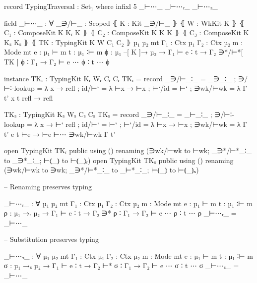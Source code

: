 \begin{code}
          record TypingTraversal : Set₁ where
            infixl  5  _⊢⋯_  _⊢⋯ᵣ_  _⊢⋯ₛ_

            field
              _⊢⋯_ :
                ∀ {_∋/⊢_ : Scoped} ⦃ K : Kit _∋/⊢_ ⦄ ⦃ W : WkKit K ⦄
                  ⦃ C₁ : ComposeKit K Kᵣ K ⦄ ⦃ C₂ : ComposeKit K K K ⦄
                  ⦃ C₃ : ComposeKit K Kₛ Kₛ ⦄
                  ⦃ TK : TypingKit K W C₁ C₂ ⦄
                  {µ₁ µ₂ mt} {Γ₁ : Ctx µ₁} {Γ₂ : Ctx µ₂} {m : Mode mt}
                  {e : µ₁ ⊢ m} {t : µ₁ ∶⊢ m} {ϕ : µ₁ –[ K ]→ µ₂} →
                Γ₁ ⊢ e ∶ t →
                Γ₂ ∋*/⊢*[ TK ] ϕ ∶ Γ₁ →
                Γ₂ ⊢ e ⋯ ϕ ∶ t ⋯ ϕ

            instance
              TKᵣ : TypingKit Kᵣ Wᵣ Cᵣ Cᵣ
              TKᵣ = record
                { _∋/⊢_∶_     = _∋_∶_
                ; ∋/⊢∶-lookup = λ x → refl
                ; id/⊢`       = λ ⊢x → ⊢x
                ; ⊢`/id       = ⊢`
                ; ∋wk/⊢wk     = λ { Γ t' x t refl → refl }
                }

              TKₛ : TypingKit Kₛ Wₛ Cₛ Cₛ
              TKₛ = record
                { _∋/⊢_∶_     = _⊢_∶_
                ; ∋/⊢∶-lookup = λ x → ⊢` refl
                ; id/⊢`       = ⊢`
                ; ⊢`/id       = λ ⊢x → ⊢x
                ; ∋wk/⊢wk     = λ Γ t' e t ⊢e → ⊢e ⊢⋯ ∋wk/⊢wk Γ t'
                }

            open TypingKit TKᵣ public using () renaming (∋wk/⊢wk to ⊢wk; _∋*/⊢*_∶_ to _∋*_∶_; ⊢⦅_⦆ to ⊢⦅_⦆ᵣ)
            open TypingKit TKₛ public using () renaming (∋wk/⊢wk to ∋wk; _∋*/⊢*_∶_ to _⊢*_∶_; ⊢⦅_⦆ to ⊢⦅_⦆ₛ)

            -- Renaming preserves typing

            _⊢⋯ᵣ_ : ∀ {µ₁ µ₂ mt} {Γ₁ : Ctx µ₁} {Γ₂ : Ctx µ₂} {m : Mode mt}
                      {e : µ₁ ⊢ m} {t : µ₁ ∶⊢ m} {ρ : µ₁ →ᵣ µ₂} →
                    Γ₁ ⊢ e ∶ t →
                    Γ₂ ∋* ρ ∶ Γ₁ →
                    Γ₂ ⊢ e ⋯ ρ ∶ t ⋯ ρ
            _⊢⋯ᵣ_ = _⊢⋯_

            -- Substitution preserves typing

            _⊢⋯ₛ_ : ∀ {µ₁ µ₂ mt} {Γ₁ : Ctx µ₁} {Γ₂ : Ctx µ₂} {m : Mode mt}
                      {e : µ₁ ⊢ m} {t : µ₁ ∶⊢ m} {σ : µ₁ →ₛ µ₂} →
                    Γ₁ ⊢ e ∶ t →
                    Γ₂ ⊢* σ ∶ Γ₁ →
                    Γ₂ ⊢ e ⋯ σ ∶ t ⋯ σ
            _⊢⋯ₛ_ = _⊢⋯_

\end{code}
